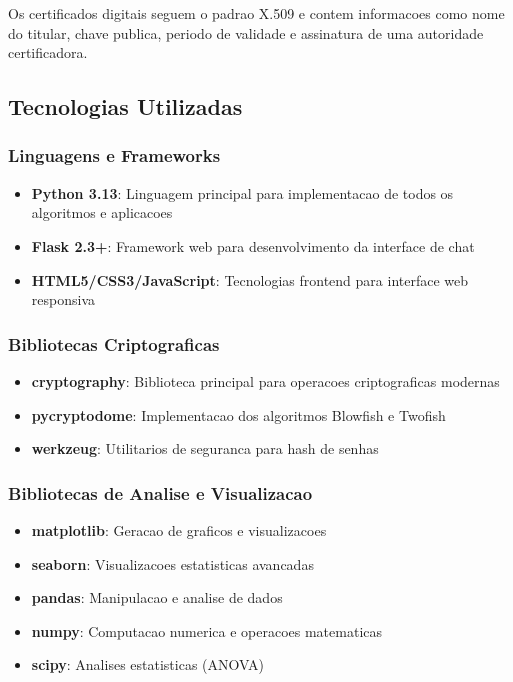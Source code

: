 \documentclass[12pt,a4paper,oneside]{article}
\begin{document}
Os certificados digitais seguem o padrao X.509 e contem informacoes como nome do titular, chave publica, periodo de validade e assinatura de uma autoridade certificadora.

\subsection{Tecnologias Utilizadas}

\subsubsection{Linguagens e Frameworks}

\begin{itemize}
    \item \textbf{Python 3.13}: Linguagem principal para implementacao de todos os algoritmos e aplicacoes
    \item \textbf{Flask 2.3+}: Framework web para desenvolvimento da interface de chat
    \item \textbf{HTML5/CSS3/JavaScript}: Tecnologias frontend para interface web responsiva
\end{itemize}

\subsubsection{Bibliotecas Criptograficas}

\begin{itemize}
    \item \textbf{cryptography}: Biblioteca principal para operacoes criptograficas modernas
    \item \textbf{pycryptodome}: Implementacao dos algoritmos Blowfish e Twofish
    \item \textbf{werkzeug}: Utilitarios de seguranca para hash de senhas
\end{itemize}

\subsubsection{Bibliotecas de Analise e Visualizacao}

\begin{itemize}
    \item \textbf{matplotlib}: Geracao de graficos e visualizacoes
    \item \textbf{seaborn}: Visualizacoes estatisticas avancadas
    \item \textbf{pandas}: Manipulacao e analise de dados
    \item \textbf{numpy}: Computacao numerica e operacoes matematicas
    \item \textbf{scipy}: Analises estatisticas (ANOVA)
\end{itemize}
\end{document}
